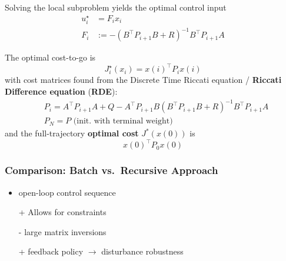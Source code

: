 \newpar{}

Solving the local subproblem yields the optimal control input
\begin{align*}
    u_{i}^{\star} & =F_{i} x_{i}                                   \\
    F_{i}         & :=-{(B^\top P_{i+1} B+R)}^{-1}B^\top P_{i+1} A
\end{align*}

The optimal cost-to-go is
\begin{equation*}
    J_{i}^{\star}(x_{i})  = {x(i)}^{\top}P_{i}x(i)
\end{equation*}
with cost matrices found from the Discrete Time Riccati equation / \textbf{Riccati Difference equation} (\textbf{RDE}):
\begin{align*}
     & P_{i} = A^\top P_{i+1} A+Q-A^\top P_{i+1} B{(B^\top P_{i+1} B+R)}^{-1}B^\top P_{i+1} A \\
     & P_{N} = P \text{ (init.\ with terminal weight)}
\end{align*}
and the full-trajectory \textbf{optimal cost} $J^*(x(0))$ is
\begin{equation*}
    {x(0)}^\top P_0 x(0)
\end{equation*}

\subsubsection{Comparison: Batch vs.\ Recursive Approach}

\begin{itemize}
    \item open-loop control sequence
    \item [+] Allows for constraints
    \item [-] large matrix inversions
\end{itemize}

\newpar{}
\begin{itemize}
    \item [+] feedback policy $\to$ disturbance robustness
\end{itemize}


